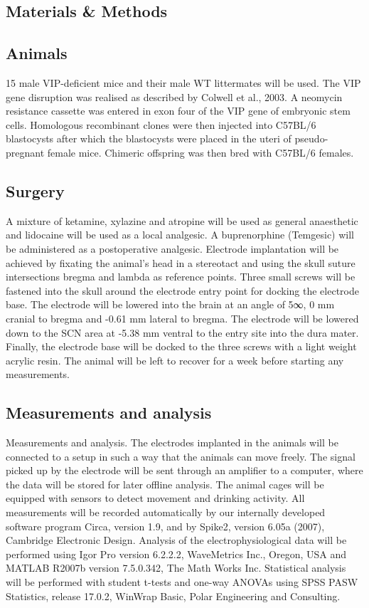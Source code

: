 \begin{multicols}{2}


\section{Materials \& Methods}

\subsection{Animals}
15 male VIP-deficient mice and their male WT littermates will be used. The VIP gene disruption was realised as described by Colwell et al., 2003. A neomycin resistance cassette was entered in exon four of the VIP gene of embryonic stem cells. Homologous recombinant clones were then injected into C57BL/6 blastocysts after which the blastocysts were placed in the uteri of pseudo-pregnant female mice. Chimeric offspring was then bred with C57BL/6 females.

\subsection{Surgery}
A mixture of ketamine, xylazine and atropine will be used as general anaesthetic and lidocaine will be used as a local analgesic. A buprenorphine (Temgesic) will be administered as a postoperative analgesic. Electrode implantation will be achieved by fixating the animal's head in a stereotact and using the skull suture intersections bregma and lambda as reference points. Three small screws will be fastened into the skull around the electrode entry point for docking the electrode base. The electrode will be lowered into the brain at an angle of 5∞, 0 mm cranial to bregma and -0.61 mm lateral to bregma. The electrode will be lowered down to the SCN area at -5.38 mm ventral to the entry site into the dura mater. Finally, the electrode base will be docked to the three screws with a light weight acrylic resin. The animal will be left to recover for a week  before starting any measurements.

\subsection{Measurements and analysis}

Measurements and analysis. The electrodes implanted in the animals will be
connected to a setup in such a way that the animals can move freely. The signal
picked up by the electrode will be sent through an amplifier to a computer,
where the data will be stored for later offline analysis. The animal cages will
be equipped with sensors to detect movement and drinking activity. All
measurements will be recorded automatically by our internally developed
software program Circa, version 1.9, and by Spike2, version 6.05a (2007),
Cambridge Electronic Design. Analysis of the electrophysiological data will be
performed using Igor Pro version 6.2.2.2, WaveMetrics Inc., Oregon, USA and
MATLAB R2007b version 7.5.0.342, The Math Works Inc. Statistical analysis will
be performed with student t-tests and one-way ANOVAs using SPSS PASW
Statistics, release 17.0.2, WinWrap Basic, Polar Engineering and Consulting.


\end{multicols}
